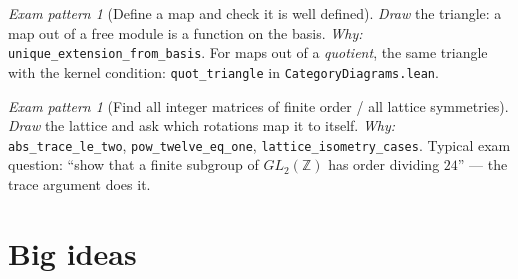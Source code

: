 \documentclass[11pt]{article}
\theoremstyle{definition}
\theoremstyle{plain}
\theoremstyle{remark}
\newtheorem{exercise}[definition]{Exam pattern}
\newcommand{\lean}[1]{\texttt{\small #1}}
\newcommand{\file}[1]{\texttt{\small #1}}
\newcommand{\Z}{\mathbb{Z}}
\begin{document}
\begin{exercise}[Define a map and check it is well defined]
\emph{Draw} the triangle: a map out of a free module is a function on the basis.
\emph{Why:} \lean{unique\_extension\_from\_basis}.  For maps out of a
\emph{quotient}, the same triangle with the kernel condition:
\lean{quot\_triangle} in \file{CategoryDiagrams.lean}.
\end{exercise}

\begin{exercise}[Find all integer matrices of finite order / all lattice symmetries]
\emph{Draw} the lattice and ask which rotations map it to itself.
\emph{Why:} \lean{abs\_trace\_le\_two}, \lean{pow\_twelve\_eq\_one},
\lean{lattice\_isometry\_cases}.  Typical exam question: ``show that a finite
subgroup of $GL_2(\Z)$ has order dividing $24$'' --- the trace argument does it.
\end{exercise}

\section{Big ideas}
\end{document}

